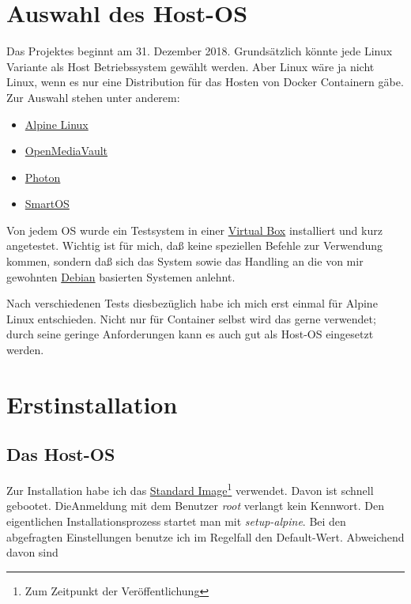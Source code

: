 \documentclass[12pt,a4paper]{article}
\newcommand{\code}[1]{\textit{#1}}
\begin{document}
\section{Auswahl des Host-OS}
Das Projektes beginnt am 31. Dezember 2018. Grundsätzlich könnte jede Linux Variante als Host Betriebssystem gewählt
werden. Aber Linux wäre ja nicht Linux, wenn es nur eine Distribution für das Hosten von Docker Containern gäbe. Zur
Auswahl stehen unter anderem:
\begin{itemize}
	\item \href{https://alpinelinux.org/}{Alpine Linux}
	\item \href{https://www.openmediavault.org/}{OpenMediaVault}
	\item \href{https://vmware.github.io/photon/}{Photon}
	\item \href{https://wiki.smartos.org/display/DOC/Welcome+to+SmartOS}{SmartOS}
\end{itemize}

Von jedem OS wurde ein Testsystem in einer \href{https://www.virtualbox.org/}{Virtual Box} installiert und kurz
angetestet. Wichtig ist für mich, daß keine speziellen Befehle zur Verwendung kommen, sondern daß sich das System sowie
das Handling an die von mir gewohnten \href{https://www.debian.org/index.de.html} {Debian} basierten Systemen anlehnt.

Nach verschiedenen Tests diesbezüglich habe ich mich erst einmal für Alpine Linux entschieden. Nicht nur für Container
selbst wird das gerne verwendet; durch seine geringe Anforderungen kann es auch gut als Host-OS eingesetzt werden.

\section{Erstinstallation}
\subsection{Das Host-OS}
Zur Installation habe ich das \href{http://dl-cdn.alpinelinux.org/alpine/v3.8/releases/x86_64/alpine-standard-3.10.2-x86_64.iso}{Standard Image}\footnote{Zum
Zeitpunkt der Veröffentlichung} verwendet. Davon ist schnell gebootet. Die\linebreak Anmeldung mit dem Benutzer \code{root}
verlangt kein Kennwort. Den eigentlichen Installationsprozess startet man mit \code{setup-alpine}. Bei den abgefragten
Einstellungen benutze ich im Regelfall den Default-Wert. Abweichend davon sind
\end{document}
